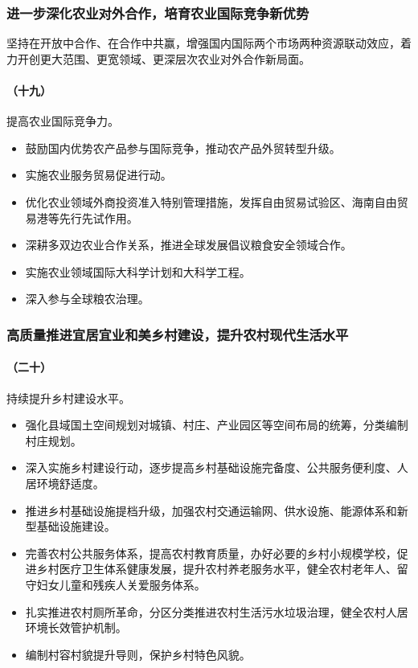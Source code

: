 \subsubsection{进一步深化农业对外合作，培育农业国际竞争新优势}

坚持在开放中合作、在合作中共赢，增强国内国际两个市场两种资源联动效应，着力开创更大范围、更宽领域、更深层次农业对外合作新局面。

\paragraph{（十九）}提高农业国际竞争力。

\begin{itemize}
    \item 鼓励国内优势农产品参与国际竞争，推动农产品外贸转型升级。
    \item 实施农业服务贸易促进行动。
    \item 优化农业领域外商投资准入特别管理措施，发挥自由贸易试验区、海南自由贸易港等先行先试作用。
    \item 深耕多双边农业合作关系，推进全球发展倡议粮食安全领域合作。
    \item 实施农业领域国际大科学计划和大科学工程。
    \item 深入参与全球粮农治理。
\end{itemize}

\subsubsection{高质量推进宜居宜业和美乡村建设，提升农村现代生活水平}

\paragraph{（二十）}持续提升乡村建设水平。

\begin{itemize}
    \item 强化县域国土空间规划对城镇、村庄、产业园区等空间布局的统筹，分类编制村庄规划。
    \item 深入实施乡村建设行动，逐步提高乡村基础设施完备度、公共服务便利度、人居环境舒适度。
    \item 推进乡村基础设施提档升级，加强农村交通运输网、供水设施、能源体系和新型基础设施建设。
    \item 完善农村公共服务体系，提高农村教育质量，办好必要的乡村小规模学校，促进乡村医疗卫生体系健康发展，提升农村养老服务水平，健全农村老年人、留守妇女儿童和残疾人关爱服务体系。
    \item 扎实推进农村厕所革命，分区分类推进农村生活污水垃圾治理，健全农村人居环境长效管护机制。
    \item 编制村容村貌提升导则，保护乡村特色风貌。
\end{itemize}

